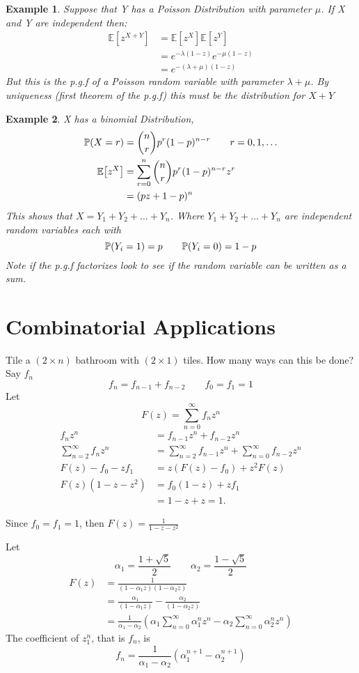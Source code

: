 \documentclass{notes}
\theoremstyle{plain}
\newtheorem*{example}{Example}
\newcommand{\bP}{\mathbb{P}}
\newcommand{\bE}{\mathbb{E}}
\newcommand{\prob}[1]{\bP \negthinspace\left(#1\right)}
\newcommand{\expect}[1]{\bE\!\left[#1\right]}
\begin{document}
\begin{example}
Suppose that Y has a Poisson Distribution with parameter $\mu$. If X and Y are
independent then:
\begin{align*}
\expect{z^{X+Y}} &= \expect{z^X}\expect{z^Y}\\
&=e^{-\lambda(1-z)}e^{-\mu(1-z)}\\
&= e^{-(\lambda+\mu)(1-z)}
\end{align*}
But this is the p.g.f of a Poisson random variable with parameter $\lambda+\mu$.
By uniqueness (first theorem of the p.g.f) this must be the distribution for
$X+Y$
\end{example}
\begin{example}
X has a binomial Distribution,
\begin{align*}
\prob{X=r} &= \binom{n}{r}p^r(1-p)^{n-r}\qquad r=0,1,\dots\\
\expect{z^X} &= \sum_{r=0}^n \binom{n}{r}p^r(1-p)^{n-r}z^r\\
&= (pz + 1-p)^n\\
\end{align*}
This shows that $X = Y_1 +Y_2 +\dots + Y_n$. Where $Y_1 +Y_2 +\dots + Y_n$
are independent random variables each with
\[
\prob{Y_i=1} = p \qquad\prob{Y_i=0} = 1-p
\]
\emph{Note} if the p.g.f factorizes look to see if the random variable can 
be written as a sum.
\end{example}

\section{Combinatorial Applications}
Tile a  $(2\times n)$ bathroom with  $(2\times 1)$ tiles. How many ways can 
this be done? Say $f_n$
\[
f_n = f_{n-1} + f_{n-2} \qquad f_0 = f_1 = 1
\]
Let
\[
F(z) = \sum_{n=0}^\infty f_n z^n
\]
\begin{align*}
f_n z^n &= f_{n-1} z^n + f_{n-2} z^n\\
\sum_{n=2}^\infty f_n z^n &= \sum_{n=2}^\infty f_{n-1} z^n
 + \sum_{n=0}^\infty f_{n-2} z^n\\
F(z) - f_0 - z f_1 &= z(F(z)-f_0) + z^2F(z)\\
F(z)(1-z-z^2) &= f_0(1-z) +z f_1\\
&= 1-z+z=1.
\end{align*}

Since $f_0 = f_1 = 1$, then $F(z) = \tfrac{1}{1-z-z^2}$

Let 
\[
\alpha_1 = \frac{1 + \sqrt{5}}{2} \qquad \alpha_2 = \frac{1- \sqrt{5}}{2}
\]
\begin{align*}
F(z) &= \frac{1}{(1-\alpha_1z)(1- \alpha_2z)}\\
&=\frac{\alpha_1}{(1-\alpha_1z)} - \frac{\alpha_2}{(1-\alpha_2z)}\\
&= \frac{1}{\alpha_1 - \alpha_2}
\left(\alpha_1\sum_{n=0}^\infty\alpha_1^nz^n  - 
\alpha_2\sum_{n=0}^\infty\alpha_2^n z^n\right)
\end{align*}
The coefficient of $z_{1}^{n}$, that is $f_n$, is
\[
f_n = \frac{1}{\alpha_1 - \alpha_2}(\alpha_1^{n+1} - \alpha_2^{n+1})
\]
\end{document}
